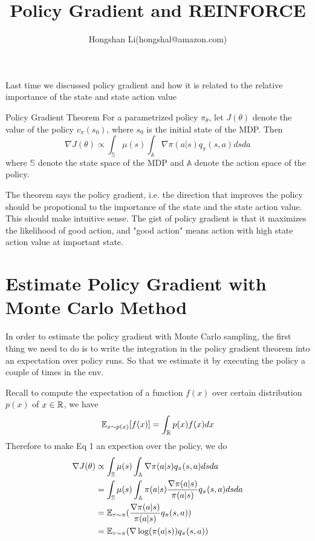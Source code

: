 \documentclass{article}
\title{Policy Gradient and REINFORCE}
\author{Hongshan Li(hongshal@amazon.com)}
\begin{document}
\maketitle
Last time we discussed policy gradient and how it is related to the relative
importance of the state and state action value

\begin{theorem}{Policy Gradient Theorem}
For a parametrized policy $\pi_{\theta}$, let $J(\theta)$ denote the
value of the policy $v_{\pi}(s_0)$, where $s_0$ is the initial 
state of the MDP. Then
\[
  \tag{1}
  \nabla J(\theta) \propto \int_{\mathbb{S}}\mu(s)
  \int_{\mathbb{A}}\nabla \pi(a|s)q_{\pi}(s, a) dsda
\]
where $\mathbb{S}$ denote the state space of the MDP and $\mathbb{A}$
denote the action space of the policy.
\end{theorem}
The theorem says the policy gradient, i.e. the direction that improves
the policy should be propotional to the importance of the state and 
the state action value. This should make intuitive sense. The gist
of policy gradient is that it maximizes the likelihood of good action,
and "good action" means action with high state action value at important
state. 

\section{Estimate Policy Gradient with Monte Carlo Method}
In order to estimate the policy gradient with Monte Carlo sampling,
the first thing we need to do is to write the integration in the policy
gradient theorem into an expectation over policy runs. So that we 
estimate it by executing the policy a couple of times in the env. 

Recall to compute the expectation of a function $f(x)$ over certain 
distribution $p(x)$ of $x \in \mathbb{R}$, we have 
\[
  \mathbb{E}_{x\sim p(x)}[f(x)] = \int_{\mathbb{R}} p(x)f(x) dx
\]
Therefore to make Eq 1 an expection over the policy, we do
\begin{align*}
  \nabla J(\theta) & \propto \int_{\mathbb{S}}\mu(s)
   \int_{\mathbb{A}}\nabla \pi(a|s)q_{\pi}(s, a) dsda \\
  & = \int_{\mathbb{S}}\mu(s)\int_{\mathbb{A}}\pi(a|s) \frac{\nabla\pi(a|s)}{\pi(a|s)}q_{\pi}(s, a) dsda \\
  & = \mathbb{E}_{\tau \sim \pi}(\frac{\nabla \pi(a|s)}{\pi(a|s)}q_{\pi}(s,a)) \\
  & = \mathbb{E}_{\tau \sim \pi}(\nabla \log(\pi(a|s))q_{\pi}(s,a)) 
\end{align*}
\end{document}
